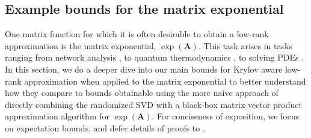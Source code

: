 





\subsection{Example bounds for the matrix exponential}\label{section:exponential}
One matrix function for which it is often desirable to obtain a low-rank approximation is the matrix exponential, $\exp(\bm{A})$. This task arises in tasks ranging from network analysis \cite{hpp}, to quantum thermodynamics \cite{chen_hallman_23,epperly2023xtrace}, to solving PDEs \cite{persson_kressner_23}. In this section, we do a deeper dive into our main bounds for Krylov aware low-rank approximation when applied to the matrix exponential to better understand how they compare to bounds obtainable using the more naive approach of directly combining the randomized SVD with a black-box matrix-vector product approximation algorithm for $\exp(\bm{A})$.  For conciseness of exposition, we focus on expectation bounds, and defer details of proofs to .

